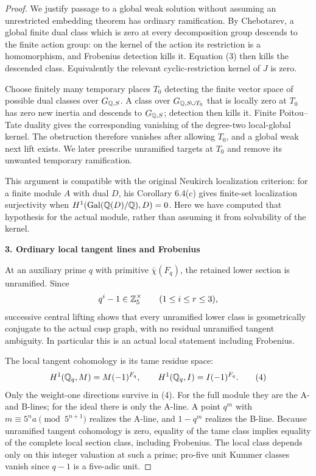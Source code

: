 \begin{proof}
We justify passage to a global weak solution without assuming an unrestricted embedding theorem has ordinary ramification. By Chebotarev, a global finite dual class which is zero at every decomposition group descends to the finite action group: on the kernel of the action its restriction is a homomorphism, and Frobenius detection kills it. Equation (3) then kills the descended class. Equivalently the relevant cyclic-restriction kernel of $J$ is zero.

Choose finitely many temporary places $T_0$ detecting the finite vector space of possible dual classes over $G_{\mathbb Q,S}$. A class over $G_{\mathbb Q,S\cup T_0}$ that is locally zero at $T_0$ has zero new inertia and descends to $G_{\mathbb Q,S}$; detection then kills it. Finite Poitou--Tate duality gives the corresponding vanishing of the degree-two local-global kernel. The obstruction therefore vanishes after allowing $T_0$, and a global weak next lift exists. We later prescribe unramified targets at $T_0$ and remove its unwanted temporary ramification.

This argument is compatible with the original Neukirch localization criterion: for a finite module $A$ with dual $D$, his Corollary 6.4(c) gives finite-set localization surjectivity when $H^1(\operatorname{Gal}(\mathbb Q(D)/\mathbb Q),D)=0$. Here we have computed that hypothesis for the actual module, rather than assuming it from solvability of the kernel.

\par\medskip\noindent\textbf{3. Ordinary local tangent lines and Frobenius}\par\nobreak\smallskip
At an auxiliary prime $q$ with primitive $\bar\chi(F_q)$, the retained lower section is unramified. Since
\[
 q^i-1\in\mathbb Z_5^\times\qquad(1\le i\le r\le3),
\]
successive central lifting shows that every unramified lower class is geometrically conjugate to the actual cusp graph, with no residual unramified tangent ambiguity. In particular this is an actual local statement including Frobenius.

The local tangent cohomology is its tame residue space:
\[
 H^1(\mathbb Q_q,M)=M(-1)^{F_q},\qquad
 H^1(\mathbb Q_q,I)=I(-1)^{F_q}.
 \tag{4}
\]
Only the weight-one directions survive in (4). For the full module they are the A- and B-lines; for the ideal there is only the A-line. A point $q^m$ with $m\equiv5^n a\pmod{5^{n+1}}$ realizes the A-line, and $1-q^m$ realizes the B-line. Because unramified tangent cohomology is zero, equality of the tame class implies equality of the complete local section class, including Frobenius. The local class depends only on this integer valuation at such a prime; pro-five unit Kummer classes vanish since $q-1$ is a five-adic unit.


\end{proof}
